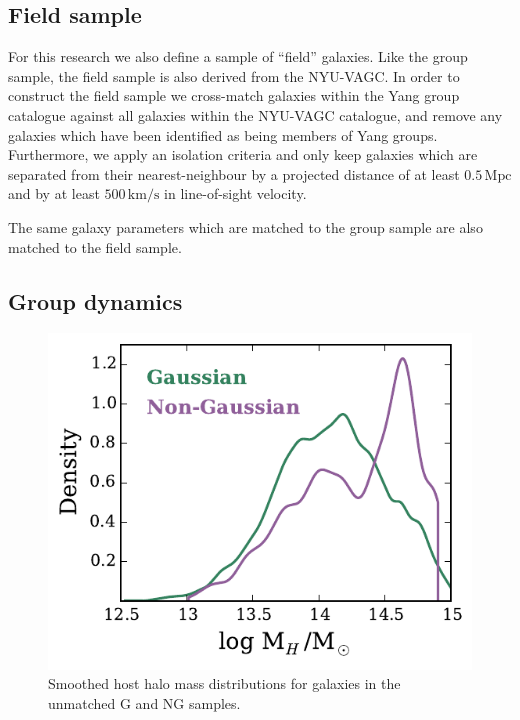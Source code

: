 \documentclass[a4paper,fleqn,usenatbib]{mnras}
\begin{document}
\subsection{Field sample}

For this research we also define a sample of ``field'' galaxies.  Like
the group sample, the field sample is also derived from the NYU-VAGC.
In order to construct the field sample we cross-match galaxies within
the Yang group catalogue against all galaxies within the NYU-VAGC
catalogue, and remove any galaxies which have been identified as being
members of Yang groups.  Furthermore, we apply an isolation
criteria and only keep galaxies which are separated from their
nearest-neighbour by a projected distance of at least
$0.5\,\mathrm{Mpc}$ and by at least $500\,\mathrm{km/s}$ in
line-of-sight velocity.
\par
The same galaxy parameters which are matched to the group sample are
also matched to the field sample.

\subsection{Group dynamics}

\begin{figure}
  \centering
  \includegraphics[width=\columnwidth]{mhdist_um.pdf}
  \caption{Smoothed host halo mass distributions for galaxies in the
    unmatched G and NG samples.}
  \label{fig:mhdist_um}
\end{figure}
\end{document}
